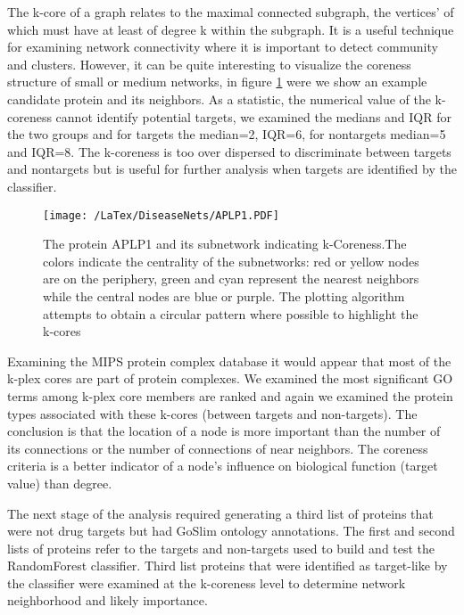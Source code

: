 \documentclass[a4paper,8pt,twocolumn,5p]{elsarticle}
\begin{document}
The k-core of a graph relates to the maximal connected subgraph, the vertices' of which must have at least of degree k within the subgraph. It is a useful technique for examining network connectivity where it is important to detect community and clusters. However, it can be quite interesting to visualize the coreness structure of small or medium networks, in figure \ref{coreness} were we show an example candidate protein and its neighbors. As a statistic, the numerical value of the k-coreness cannot identify potential targets, we examined the medians and IQR for the two groups and for targets the median=2, IQR=6, for nontargets median=5 and IQR=8.  The k-coreness is too over dispersed to discriminate between targets and nontargets but is useful for further analysis when targets are identified by the classifier.

\begin{figure}[h]
\centering
    \texttt{[image: /LaTex/DiseaseNets/APLP1.PDF]}
     \caption{The protein APLP1 and its subnetwork indicating k-Coreness.The colors indicate the centrality of the subnetworks: red or yellow nodes are on the periphery, green and cyan represent the nearest neighbors while the central nodes are blue or purple. The plotting algorithm attempts to obtain a circular pattern where possible to highlight the k-cores}\label{coreness}
\end{figure}

Examining the MIPS protein complex database it would appear that most  of the k-plex cores are part of protein complexes. We examined   the  most  significant  GO terms among k-plex core members are ranked and again we examined the protein types associated with these k-cores (between targets and non-targets).  The conclusion is that the location of a node is more important than the number of its connections or the number of connections of near neighbors. The coreness criteria is a better indicator of a node’s influence on biological function (target value) than degree.

The next stage of the analysis required generating a third list of proteins that were not drug targets  but had GoSlim ontology annotations. The first and second lists of proteins refer to the targets and non-targets used to build and test the RandomForest classifier. Third list proteins that were identified as target-like by the classifier were examined at the k-coreness level to determine network neighborhood and likely importance.
\end{document}
